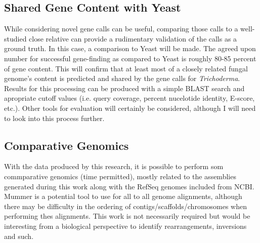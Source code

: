\subsection{Shared Gene Content with Yeast}

While considering novel gene calls can be useful, comparing those
calls to a well-studied close relative can provide a rudimentary
validation of the calls as a ground truth. In this case, a comparison
to Yeast will be made. The agreed upon number for successful
gene-finding as compared to Yeast is roughly 80-85 percent of gene
content. This will confirm that at least most of a closely related
fungal genome's content is predicted and shared by the gene calls for
\textit{Trichoderma}. Results for this processing can be produced with
a simple BLAST search and apropriate cutoff values (i.e. query
coverage, percent nucelotide identity, E-score, etc.). Other tools for
evaluation will certainly be considered, although I will need to look
into this process further.

\subsection{Comparative Genomics}

With the data produced by this research, it is possible to perform som
commparative genomics (time permitted), mostly related to the
assemblies generated during this work along with the RefSeq genomes
included from NCBI. Mummer is a potential tool to use for all to all
genome alignments, although there may be difficulty in the ordering of
contigs/scaffolds/chromosomes when performing thes alignments. This
work is not necessarily required but would be interesting from a
biological perspective to identify rearrangements, inversions and
such.
